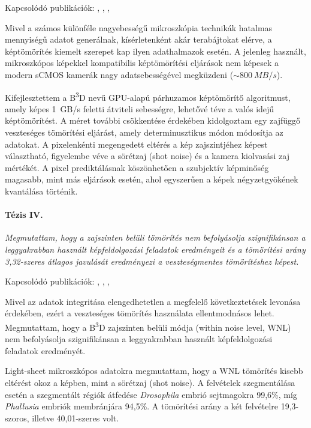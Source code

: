\documentclass{booklet_style}
\def\b3d{B\textsuperscript{3}D}
\begin{document}
    Kapcsolódó publikációk: \cite{balazs_real-time_2017}, \cite{balazs_gpu-based_2016}, \cite{balazs_gpu-based_2016-1}, \cite{balazs_gpu-based_2017}
    
    Mivel a számos különféle nagyebességű mikroszkópia technikák hatalmas mennyiségű adatot generálnak, kísérletenként akár terabájtokat elérve, a képtömörítés kiemelt szerepet kap ilyen adathalmazok esetén. A jelenleg használt, mikroszkópos képekkel kompatibilis képtömörítési eljárások nem képesek a modern sCMOS kamerák nagy adatsebességével megküzdeni ($\sim \SI{800}{MB/s}$).

    Kifejlesztettem a \b3d nevű GPU-alapú párhuzamos képtömörítő algoritmust, amely képes \SI{1}{GB/s} feletti átviteli sebességre, lehetővé téve a valós idejű képtömörítést. A méret további csökkentése érdekében kidolgoztam egy zajfüggő veszteséges tömörítési eljárást, amely determinusztikus módon módosítja az adatokat. A pixelenkénti megengedett eltérés a kép zajszintjéhez képest választható, figyelembe véve a sörétzaj (shot noise) és a kamera kiolvasási zaj mértékét. A pixel prediktálásnak köszönhetően a szubjektív képminőség magasabb, mint más eljárások esetén, ahol egyszerűen a képek négyzetgyökének kvantálása történik.
  


  \paragraph{Tézis IV.} \textit{Megmutattam, hogy a zajszinten belüli tömörítés nem befolyásolja szignifikánsan a leggyakrabban használt képfeldolgozási feladatok eredményeit és a tömörítési arány 3,32-szeres átlagos javulását eredményezi a veszteségmentes tömörítéshez képest.}
  
    Kapcsolódó publikációk: \cite{balazs_real-time_2017}, \cite{balazs_gpu-based_2016}, \cite{balazs_gpu-based_2016-1}, \cite{balazs_gpu-based_2017}
    
    Mivel az adatok integritása elengedhetetlen a megfelelő következtetések levonása érdekében, ezért a veszteséges tömörítés használata ellentmodnásos lehet.
    Megmutattam, hogy a \b3d zajszinten belüli módja (within noise level, WNL) nem befolyásolja szignifikánsan a leggyakrabban használt képfeldolgozási feladatok eredményét.
    
    Light-sheet mikroszkópos adatokra megmutattam, hogy a WNL tömörítés kisebb eltérést okoz a képben, mint a sörétzaj (shot noise). A felvételek szegmentálása esetén a szegmentált régiók átfedése \textit{Drosophila} embrió sejtmagokra 99,6\%, míg \textit{Phallusia} embriók membránjára 94,5\%. A tömörítési arány a két felvételre 19,3-szoros, illetve 40,01-szeres volt.
    
\end{document}
